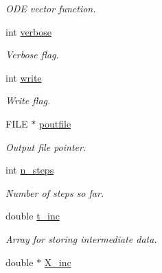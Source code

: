 \begin{DoxyCompactItemize}
\begin{DoxyCompactList}\small\item\em O\-D\-E vector function. \end{DoxyCompactList}\item 
\hypertarget{structfweuler_a71969341520cf6b76abcc298471743da}{int \hyperlink{structfweuler_a71969341520cf6b76abcc298471743da}{verbose}}\label{structfweuler_a71969341520cf6b76abcc298471743da}

\begin{DoxyCompactList}\small\item\em Verbose flag. \end{DoxyCompactList}\item 
\hypertarget{structfweuler_a6f9c2735d7a016c50a343b17cde41d5d}{int \hyperlink{structfweuler_a6f9c2735d7a016c50a343b17cde41d5d}{write}}\label{structfweuler_a6f9c2735d7a016c50a343b17cde41d5d}

\begin{DoxyCompactList}\small\item\em Write flag. \end{DoxyCompactList}\item 
\hypertarget{structfweuler_ad2d6e50980d4a77a79652527c36d03ab}{F\-I\-L\-E $\ast$ \hyperlink{structfweuler_ad2d6e50980d4a77a79652527c36d03ab}{poutfile}}\label{structfweuler_ad2d6e50980d4a77a79652527c36d03ab}

\begin{DoxyCompactList}\small\item\em Output file pointer. \end{DoxyCompactList}\item 
\hypertarget{structfweuler_a3ed5377d7609cbeef32422ad5662ab62}{int \hyperlink{structfweuler_a3ed5377d7609cbeef32422ad5662ab62}{n\-\_\-steps}}\label{structfweuler_a3ed5377d7609cbeef32422ad5662ab62}

\begin{DoxyCompactList}\small\item\em Number of steps so far. \end{DoxyCompactList}\item 
\hypertarget{structfweuler_a24bbdf908ad0e3997194b2f9901a93e4}{double \hyperlink{structfweuler_a24bbdf908ad0e3997194b2f9901a93e4}{t\-\_\-inc}}\label{structfweuler_a24bbdf908ad0e3997194b2f9901a93e4}

\begin{DoxyCompactList}\small\item\em Array for storing intermediate data. \end{DoxyCompactList}\item 
\hypertarget{structfweuler_abb379c1efee260436de2484366a53c47}{double $\ast$ \hyperlink{structfweuler_abb379c1efee260436de2484366a53c47}{X\-\_\-inc}}\label{structfweuler_abb379c1efee260436de2484366a53c47}


\end{DoxyCompactItemize}
